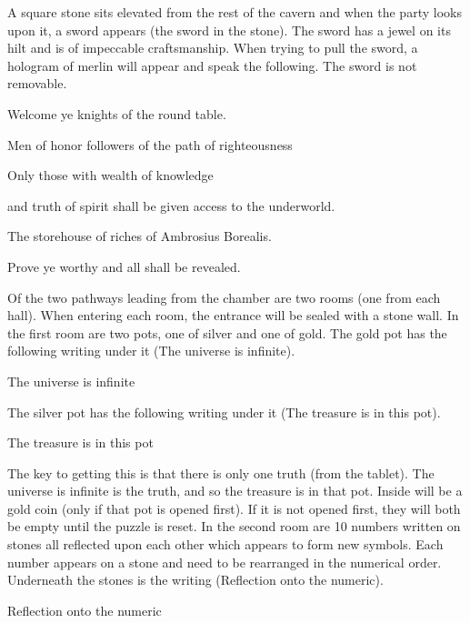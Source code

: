 A square stone sits elevated from the rest of the cavern and when the party looks upon it, a sword appears (the sword in the stone). The sword has a jewel on its hilt and is of impeccable craftsmanship. When trying to pull the sword, a hologram of merlin will appear and speak the following. The sword is not removable.

\begin{center}
	Welcome ye knights of the round table.
	
	Men of honor followers of the path of righteousness
	
	Only those with wealth of knowledge
	
	and truth of spirit shall be given access to the underworld.
	
	The storehouse of riches of Ambrosius Borealis. 
	
	Prove ye worthy and all shall be revealed.
\end{center}

Of the two pathways leading from the chamber are two rooms (one from each hall). When entering each room, the entrance will be sealed with a stone wall. In the first room are two pots, one of silver and one of gold. The gold pot has the following writing under it (The universe is infinite). 

\begin{center}
	{\Large{} The universe is infinite}
\end{center}

The silver pot has the following writing under it (The treasure is in this pot).

\begin{center}
	{\Large{} The treasure is in this pot}
\end{center}

The key to getting this is that there is only one truth (from the tablet). The universe is infinite is the truth, and so the treasure is in that pot. Inside will be a gold coin (only if that pot is opened first). If it is not opened first, they will both be empty until the puzzle is reset. In the second room are 10 numbers written on stones all reflected upon each other which appears to form new symbols. Each number appears on a stone and need to be rearranged in the numerical order. Underneath the stones is the writing (Reflection onto the numeric).

\begin{center}
	{\Large{} Reflection onto the numeric}
\end{center}

